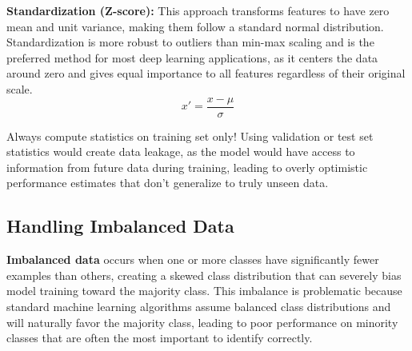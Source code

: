 \textbf{Standardization (Z-score):} This approach transforms features to have zero mean and unit variance, making them follow a standard normal distribution. Standardization is more robust to outliers than min-max scaling and is the preferred method for most deep learning applications, as it centers the data around zero and gives equal importance to all features regardless of their original scale.
\begin{equation}
x' = \frac{x - \mu}{\sigma}
\end{equation}

Always compute statistics on training set only!  Using validation or test set statistics would create data leakage, as the model would have access to information from future data during training, leading to overly optimistic performance estimates that don't generalize to truly unseen data.


\subsection{Handling Imbalanced Data}

\textbf{Imbalanced data} occurs when one or more classes have significantly fewer examples than others, creating a skewed class distribution that can severely bias model training toward the majority class. This imbalance is problematic because standard machine learning algorithms assume balanced class distributions and will naturally favor the majority class, leading to poor performance on minority classes that are often the most important to identify correctly.

